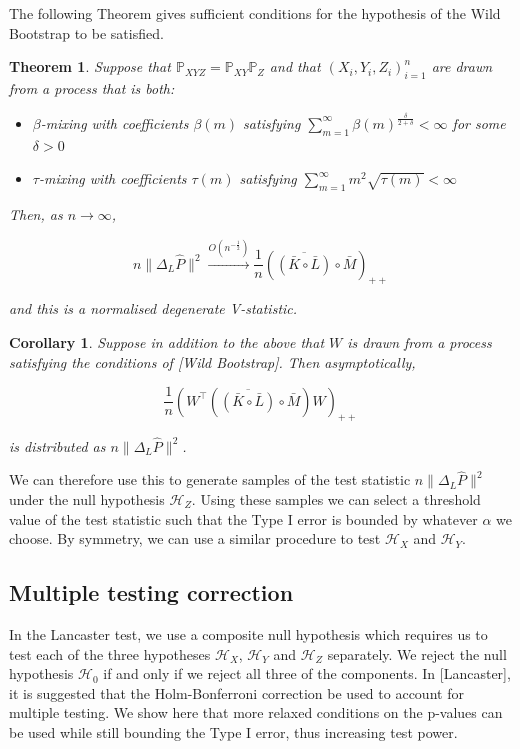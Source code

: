 \documentclass[]{article}
\newtheorem{theorem}{Theorem}
\newtheorem{corollary}{Corollary}
\begin{document}
The following Theorem gives sufficient conditions for the hypothesis of the Wild Bootstrap to be satisfied.

\begin{theorem}\label{theorem:lancasterAsymptote}
Suppose that $\mathbb{P}_{XYZ} = \mathbb{P}_{XY}\mathbb{P}_Z$ and that $(X_i,Y_i,Z_i)_{i=1}^n$ are drawn from a process that is both:

\begin{itemize}
\item $\beta$-mixing with coefficients $\beta(m)$ satisfying $\sum_{m=1}^{\infty}\beta(m)^{\frac{\delta}{2+\delta}}<\infty$ for some $\delta>0$
\item $\tau$-mixing with coefficients $\tau(m)$ satisfying $\sum_{m=1}^\infty m^2 \sqrt{\tau(m)} < \infty$
\end{itemize}  Then, as $n\longrightarrow \infty$, 

\[ n\| \Delta_L\hat{P} \|^2 \xrightarrow{O(n^{-\frac{1}{2}})} \frac{1}{n}\left( \overline{\left( \bar{K} \circ \bar{L}\right) }\circ \bar{M} \right) _{++} \]

and this is a normalised degenerate V-statistic.
\end{theorem}

\begin{corollary}
Suppose in addition to the above that $W$ is drawn from a process satisfying the conditions of [Wild Bootstrap]. Then asymptotically,

\[\frac{1}{n}\left(W^\intercal\left( \overline{\left( \bar{K} \circ \bar{L}\right) }\circ \bar{M} \right)W\right) _{++}\]

is distributed as $ n\| \Delta_L\hat{P} \|^2$. 
\end{corollary}

We can therefore use this to generate samples of the test statistic $ n\| \Delta_L\hat{P} \|^2$ under the null hypothesis $\mathcal{H}_Z$. Using these samples we can select a threshold value of the test statistic such that the Type I error is bounded by whatever $\alpha$ we choose. By symmetry, we can use a similar procedure to test $\mathcal{H}_X$ and $\mathcal{H}_Y$.

\subsection*{Multiple testing correction}
In the Lancaster test, we use a composite null hypothesis which requires us to test each of the three hypotheses $\mathcal{H}_X$, $\mathcal{H}_Y$ and $\mathcal{H}_Z$ separately. We reject the null hypothesis $\mathcal{H}_0$ if and only if we reject all three of the components. In [Lancaster], it is suggested that the Holm-Bonferroni correction be used to account for multiple testing. We show here that more relaxed conditions on the p-values can be used while still bounding the Type I error, thus increasing test power.
\end{document}
